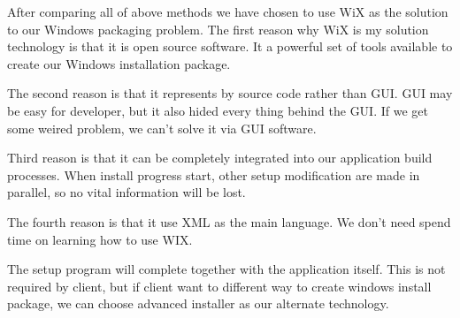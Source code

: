 
After comparing all of above methods we have chosen to use WiX as the solution to our Windows packaging problem.
The first reason why WiX is my solution technology is that it is open source software.
It a powerful set of tools available to create our Windows installation package.

The second reason is that it represents by source code rather than GUI.
GUI may be easy for developer, but it also hided every thing behind the GUI.
If we get some weired problem, we can't solve it via GUI software.

Third reason is that it can be completely integrated into our application build processes.
When install progress start, other setup modification are made in parallel, so no vital information will be lost.

The fourth reason is that it use XML as the main language.
We don't need spend time on learning how to use WIX.

The setup program will complete together with the application itself.
This is not required by client, but if client want to different way to create windows install package, we can choose advanced installer as our alternate technology.
